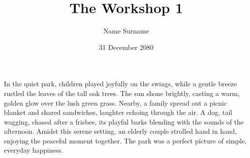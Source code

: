 \documentclass{article}
\title{The Workshop 1}
\author{Name Surname}
\date{31 December 2080}
\begin{document}
\maketitle

In the quiet park, children played joyfully 
on the swings, while a gentle breeze rustled 
the leaves of the tall oak trees. 
The sun shone brightly, casting a warm, 
golden glow over the lush green grass. 
Nearby, a family spread out a picnic blanket 
and shared sandwiches, laughter echoing 
through the air. 
A dog, tail wagging, chased after a frisbee, 
its playful barks blending with 
the sounds of the afternoon. 
Amidst this serene setting, 
an elderly couple strolled hand in hand, 
enjoying the peaceful moment together. 
The park was a perfect picture of simple, 
everyday happiness.
\end{document}
